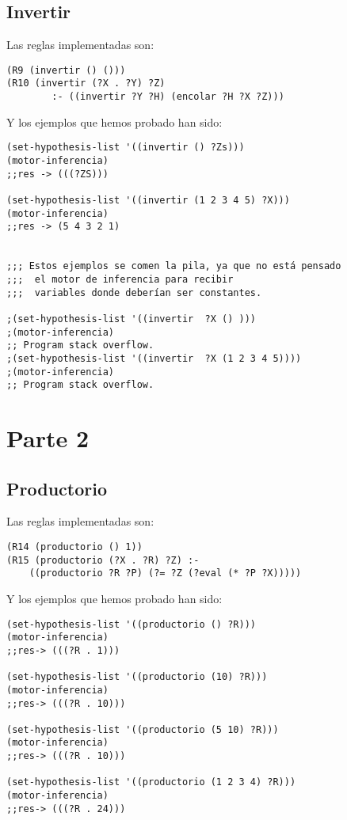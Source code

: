 \documentclass[nochap]{apuntes}
\begin{document}
\subsection*{Invertir}
Las reglas implementadas son:\\
\begin{lstlisting}[frame=single]
(R9 (invertir () ()))
(R10 (invertir (?X . ?Y) ?Z) 
		:- ((invertir ?Y ?H) (encolar ?H ?X ?Z)))
\end{lstlisting}
Y los ejemplos que hemos probado han sido:\\

\begin{lstlisting}[frame=single]
(set-hypothesis-list '((invertir () ?Zs)))
(motor-inferencia)
;;res -> (((?ZS)))

(set-hypothesis-list '((invertir (1 2 3 4 5) ?X)))
(motor-inferencia)
;;res -> (5 4 3 2 1)


;;; Estos ejemplos se comen la pila, ya que no está pensado
;;;	 el motor de inferencia para recibir
;;;	 variables donde deberían ser constantes.

;(set-hypothesis-list '((invertir  ?X () )))
;(motor-inferencia)
;; Program stack overflow.
;(set-hypothesis-list '((invertir  ?X (1 2 3 4 5))))
;(motor-inferencia)
;; Program stack overflow.
\end{lstlisting}


\section*{Parte 2}


\subsection*{Productorio}
Las reglas implementadas son:\\

\begin{lstlisting}[frame=single]
(R14 (productorio () 1))
(R15 (productorio (?X . ?R) ?Z) :- 
	((productorio ?R ?P) (?= ?Z (?eval (* ?P ?X)))))
\end{lstlisting}
Y los ejemplos que hemos probado han sido:\\

\begin{lstlisting}[frame=single]
(set-hypothesis-list '((productorio () ?R)))
(motor-inferencia)
;;res-> (((?R . 1)))

(set-hypothesis-list '((productorio (10) ?R)))
(motor-inferencia)
;;res-> (((?R . 10)))

(set-hypothesis-list '((productorio (5 10) ?R)))
(motor-inferencia)
;;res-> (((?R . 10)))

(set-hypothesis-list '((productorio (1 2 3 4) ?R)))
(motor-inferencia)
;;res-> (((?R . 24)))
\end{lstlisting}
\end{document}
